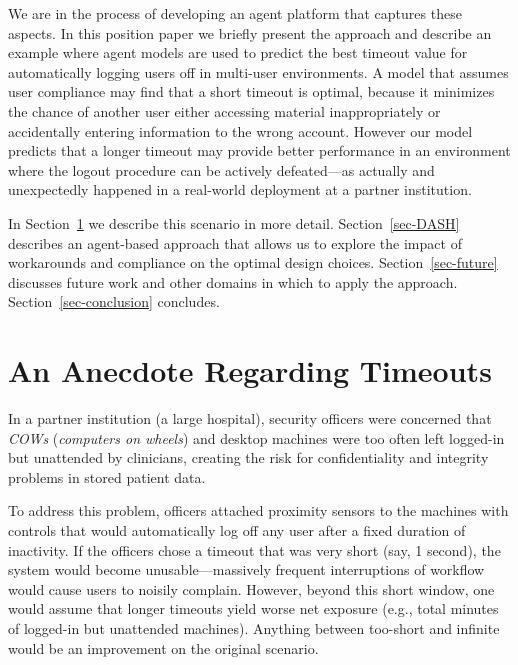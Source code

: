 \documentclass{acm_proc_article-sp}
\newcommand{\secref}[1] {Section~\ref{sec-#1}}
\newcommand{\ignore}[1] {}
\begin{document}
We are in the process of developing an agent platform that captures
these aspects. In this position paper we briefly present the approach
and describe an example where agent models are used to predict the
best timeout value for automatically logging users off in multi-user
environments.  A model that assumes user compliance may find that a
short timeout is optimal, because it minimizes the chance of another
user either accessing material inappropriately or accidentally
entering information to the wrong account. However our model predicts
that a longer timeout may provide better performance in an environment
where the logout procedure can be actively defeated---as actually and
unexpectedly happened in a real-world deployment at a partner
institution.

In \secref{timeouts} we describe this scenario in more
detail. \secref{DASH} describes an agent-based approach that allows us
to explore the impact of workarounds and compliance on the optimal
design choices. \secref{future} discusses future work and other
domains in which to apply the approach. \secref{conclusion} concludes.

\section{An Anecdote Regarding Timeouts}
\label{sec-timeouts}


In a partner institution (a large hospital), security officers were concerned
that {\em COWs} ({\em computers on wheels}) and desktop machines were 
too often left logged-in but unattended by clinicians, creating
the risk for confidentiality and integrity problems in stored patient data.

\ignore{In a partner institution (a large hospital),
clinicians used {\em COWs} ({\em computers on wheels}) and desktop machines.
The security officers were concerned
that these systems were too often left logged-in but unattended, creating
the risk for confidentiality and integrity problems in stored patient data.}

\ignore{To address this problem, the officers attached proximity sensors to the machines and added controls that,
when detecting that a computer had been left unattended but logged-in for a predetermined, fixed, period of time, the user would be automatically logged off.}
To address this problem, officers attached proximity sensors to the machines 
with controls that would automatically log off any user after a fixed 
duration of inactivity.
If the officers chose a timeout that was very short (say, 1 second),
the system would become unusable---massively frequent interruptions of workflow would cause users to noisily complain.  
However, beyond this short window, one would assume that longer timeouts
yield worse net exposure (e.g., total minutes of logged-in but unattended machines).   Anything between too-short and infinite would be an improvement 
on the original scenario.
\end{document}
